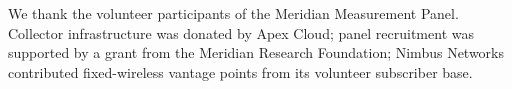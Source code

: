 \begin{acks}
We thank the volunteer participants of the Meridian Measurement Panel. Collector
infrastructure was donated by Apex Cloud; panel recruitment was supported by a grant from
the Meridian Research Foundation; Nimbus Networks contributed fixed-wireless vantage points
from its volunteer subscriber base.
\end{acks}
